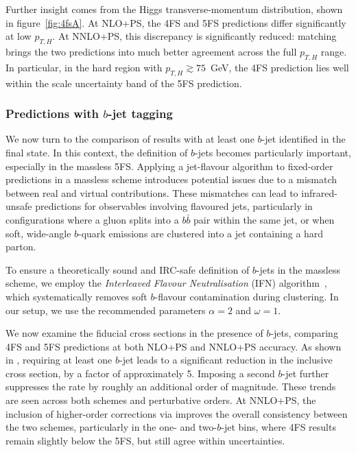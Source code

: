 \documentclass[11pt,a4paper]{article}
\begin{document}
Further insight comes from the Higgs transverse-momentum distribution, shown in figure~\ref{fig:4fsA}. At NLO+PS, the 4FS and 5FS predictions differ significantly at low \(p_{T,H}\). At NNLO+PS, this discrepancy is significantly reduced: \minnlo{} matching brings the two predictions into much better agreement across the full \(p_{T,H}\) range. In particular, in the hard region with \(p_{T,H} \gtrsim 75\)~GeV, the 4FS prediction lies well within the scale uncertainty band of the 5FS prediction.
 
\subsubsection*{Predictions with $b$-jet tagging}
We now turn to the comparison of results with at least one $b$-jet identified in the final state. In this context, the definition of $b$-jets becomes particularly important, especially in the massless 5FS. Applying a jet-flavour algorithm to fixed-order predictions in a massless scheme introduces potential issues due to a mismatch between real and virtual contributions. These mismatches can lead to infrared-unsafe predictions for observables involving flavoured jets, particularly in configurations where a gluon splits into a $b\bar{b}$ pair within the same jet, or when soft, wide-angle $b$-quark emissions are clustered into a jet containing a hard parton. 

To ensure a theoretically sound and IRC-safe definition of $b$-jets in the massless scheme, we employ the \emph{Interleaved Flavour Neutralisation} (IFN) algorithm~\cite{Caola:2023wpj}, which systematically removes soft $b$-flavour contamination during clustering. In our setup, we use the recommended parameters $\alpha = 2$ and $\omega = 1$. 

We now examine the fiducial cross sections in the presence of $b$-jets, comparing 4FS and 5FS predictions at both NLO+PS and NNLO+PS accuracy. As shown in , requiring at least one $b$-jet leads to a significant reduction in the inclusive cross section, by a factor of approximately 5. Imposing a second $b$-jet further suppresses the rate by roughly an additional order of magnitude. These trends are seen across both schemes and perturbative orders. At NNLO+PS, the inclusion of higher-order corrections via \minnlo{} improves the overall consistency between the two schemes, particularly in the one- and two-$b$-jet bins, where 4FS results remain slightly below the 5FS, but still agree within uncertainties.
\end{document}
